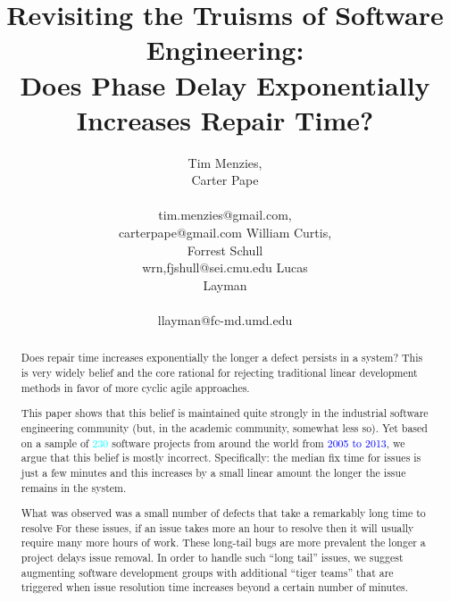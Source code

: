 \documentclass{sig-alternate}
\newcommand{\bill}[1]{\textcolor{blue}{#1}}
\newcommand{\carter}[1]{\textcolor{cyan}{#1}}
\begin{document}
\title{Revisiting the Truisms of Software Engineering:\\ Does Phase Delay Exponentially Increases  Repair Time?}
\author{
\alignauthor
Tim Menzies, \\Carter Pape\\
       \\
       tim.menzies@gmail.com,\\carterpape@gmail.com
\alignauthor
William Curtis,\\ Forrest Schull\\
wrn,fjshull@sei.cmu.edu
\alignauthor
Lucas \\Layman\\
       \\ 
       llayman@fc-md.umd.edu
} 


 
\maketitle
\begin{abstract}
Does
repair time increases exponentially
the longer a defect persists in a system?
This  is very widely belief and the core rational  for
 rejecting   traditional linear development methods
 in favor of more cyclic agile approaches.

This paper shows that this belief is maintained
quite strongly in the industrial software engineering
community (but, in the academic community, somewhat less so).
Yet based on a sample of 
\carter{230} software projects from around the world from 
\bill{2005 to 2013}, we argue that this belief is mostly 
incorrect. Specifically: the median fix time for issues
is just a few minutes and this increases by a small linear amount
the longer the issue remains in the system. 

What was observed was a small number
of defects that take a remarkably long time to resolve
For these issues, if an issue takes more an hour
to resolve then it will usually require many more hours of work.
These long-tail bugs
are more prevalent the longer a project delays issue removal. 
In order to handle such ``long tail'' issues,
we suggest  augmenting software
development groups with additional ``tiger teams'' that are triggered
when issue resolution time increases beyond a certain number of
minutes.
\end{abstract}
\end{document}
